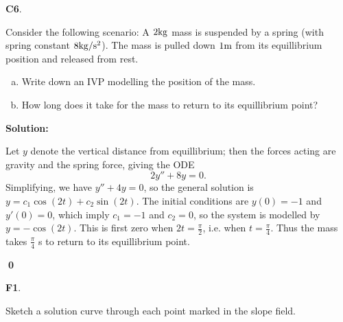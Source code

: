 \documentclass{article}
\newenvironment{problem}[1]
{
  \begin{flushleft}
  \textbf{#1}.
  \ignorespaces
}
{
  \end{flushleft}
}
\newenvironment{solution}
{
  \ignorespaces
  \textbf{Solution:}
}
{
  \ignorespacesafterend
  \begin{flushright}
  {\bfseries \qed}
  \end{flushright}
}
\begin{document}
\begin{problem}{C6}
Consider the following scenario:
A \(2 {\rm kg}\) mass is suspended by a spring (with spring constant \(8 {\rm kg /s^2}\)).  The mass is pulled down \(1 {\rm m}\) from its equillibrium position and released from rest.  
\begin{enumerate}[(a)]
\item Write down an IVP modelling the position of the mass.
\item How long does it take for the mass to return to its equillibrium point?
\end{enumerate}
\end{problem}
\begin{solution}
Let \(y\) denote the vertical distance from equillibrium; then the forces acting are gravity and the spring force, giving the ODE
\[ 2y''+8y=0 .\]
Simplifying, we have \(y''+4y=0\), so the general solution is \(y=c_1 \cos(2t)+c_2\sin(2t)\).  The initial conditions are \(y(0)=-1\) and \(y'(0)=0\), which imply \(c_1=-1\) and \(c_2=0\), so the system is modelled by \(y=-\cos(2t)\).  This is first zero when \(2t=\frac{\pi}{2}\), i.e. when \(t=\frac{\pi}{4}\).  Thus the mass takes \(\frac{\pi}{4}\) {\rm s} to return to its equillibrium point.
\end{solution}




\begin{problem}{F1}
Sketch a solution curve through each point marked in the slope field.

\begin{center}\end{center}
\end{problem}
\end{document}
